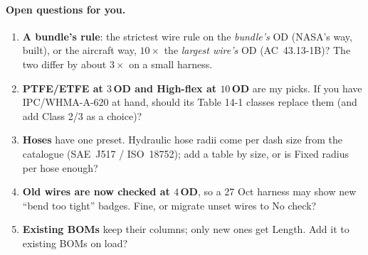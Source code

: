 \paragraph{Open questions for you.}
\begin{enumerate}[nosep]
  \item \textbf{A bundle's rule}: the strictest wire rule on the \emph{bundle's} OD (NASA's way, built), or the
        aircraft way, $10\times$ the \emph{largest wire's} OD (AC~43.13-1B)? The two differ by about $3\times$ on a
        small harness.
  \item \textbf{PTFE/ETFE at $3\,$OD and High-flex at $10\,$OD} are my picks. If you have IPC/WHMA-A-620 at hand,
        should its Table 14-1 classes replace them (and add Class 2/3 as a choice)?
  \item \textbf{Hoses} have one preset. Hydraulic hose radii come per dash size from the catalogue (SAE~J517 /
        ISO~18752); add a table by size, or is Fixed radius per hose enough?
  \item \textbf{Old wires are now checked at $4\,$OD}, so a 27 Oct harness may show new ``bend too tight'' badges.
        Fine, or migrate unset wires to No check?
  \item \textbf{Existing BOMs} keep their columns; only new ones get Length. Add it to existing BOMs on load?
\end{enumerate}
